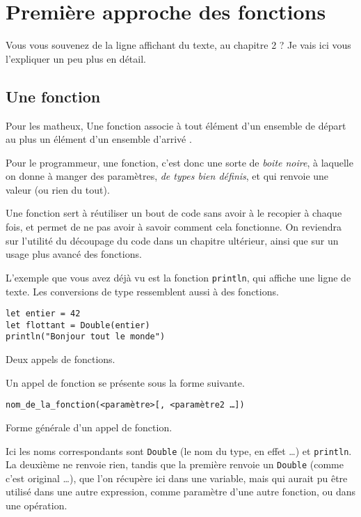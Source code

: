 \section{Première approche des fonctions}
Vous vous souvenez de la ligne affichant du texte, au chapitre 2 ? Je vais ici vous l'expliquer un peu plus en détail.
\subsection{Une fonction}
Pour les matheux, \og Une fonction associe à tout élément d'un ensemble de départ au plus un élément d'un ensemble d'arrivé \fg{}.

Pour le programmeur, une fonction, c'est donc une sorte de \emph{boite noire}, à laquelle on donne à manger des paramètres, \emph{de types bien définis}, et qui renvoie une valeur (ou rien du tout).

Une fonction sert à réutiliser un bout de code sans avoir à le recopier à chaque fois, et permet de ne pas avoir à savoir comment cela fonctionne.
On reviendra sur l'utilité du découpage du code dans un chapitre ultérieur,
ainsi que sur un usage plus avancé des fonctions.

L'exemple que vous avez déjà vu est la fonction \texttt{println}, qui affiche une ligne de texte. Les conversions de type ressemblent aussi à des fonctions.

\begin{listing}[h]
\begin{verbatim}
let entier = 42
let flottant = Double(entier)
println("Bonjour tout le monde")
\end{verbatim}
\caption{Deux appels de fonctions.}
\end{listing}

Un appel de fonction se présente sous la forme suivante.
\begin{listing}[h]
\begin{verbatim}
nom_de_la_fonction(<paramètre>[, <paramètre2 …]) 
\end{verbatim}
\caption{Forme générale d'un appel de fonction.}
\end{listing}

Ici les noms correspondants sont \texttt{Double} (le nom du type, en effet …) et \texttt{println}. La deuxième ne renvoie rien, tandis que la première renvoie un \texttt{Double} (comme c'est original …), que l'on récupère ici dans une variable, mais qui aurait pu être utilisé dans une autre expression, comme paramètre d'une autre fonction, ou dans une opération.

